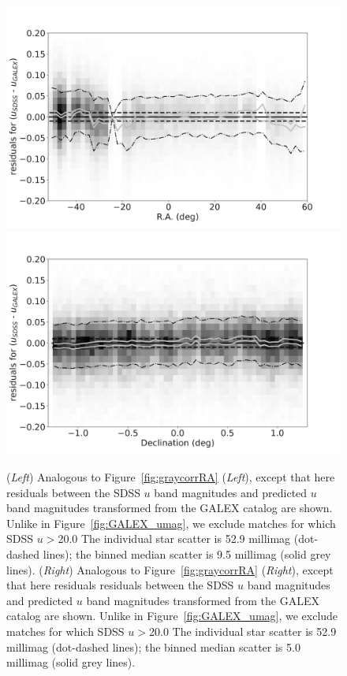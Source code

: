 \documentclass[fleqn,usenatbib]{mnras}
\begin{document}
\begin{figure}
    \centering\includegraphics[width=0.95\columnwidth]{figures/colorResidGALEXbright_du_est_RA_Hess_lr.png}
    \centering\includegraphics[width=0.95\columnwidth]{figures/colorResidGALEXbright_du_est_Dec_Hess_lr.png}
\caption{({\it Left}) Analogous to Figure~\ref{fig:graycorrRA} ({\it Left}), except that here
  residuals between the SDSS $u$ band magnitudes and
  predicted $u$ band magnitudes transformed from the GALEX catalog are
  shown.  Unlike in Figure~\ref{fig:GALEX_umag}, we exclude matches for
  which SDSS $u$$>$20.0 The individual star scatter is 52.9 millimag
  (dot-dashed lines); the binned median scatter is 9.5 millimag (solid
  grey lines). ({\it Right}) Analogous to Figure~\ref{fig:graycorrRA} ({\it Right}), except that here
  residuals residuals between the SDSS $u$ band magnitudes and
  predicted $u$ band magnitudes transformed from the GALEX catalog are
  shown.  Unlike in Figure~\ref{fig:GALEX_umag}, we exclude matches
  for which SDSS $u$$>$20.0 The individual star scatter is 52.9
  millimag (dot-dashed lines); the binned median scatter is 5.0
  millimag (solid grey lines). 
}
\label{fig:GALEX_RA}
\end{figure}
\end{document}
